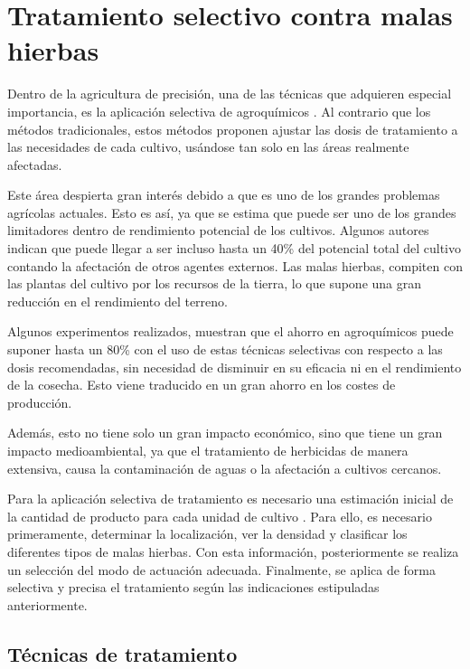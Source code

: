 \section{Tratamiento selectivo contra malas hierbas}

Dentro de la agricultura de precisión, una de las técnicas que adquieren especial importancia, es la aplicación selectiva de agroquímicos \cite{precisionweedmanagement}. Al contrario que los métodos tradicionales, estos métodos proponen ajustar las dosis de tratamiento a las necesidades de cada cultivo, usándose tan solo en las áreas realmente afectadas.

Este área despierta gran interés debido a que es uno de los grandes problemas agrícolas actuales. Esto es así, ya que se estima que puede ser uno de los grandes limitadores dentro de rendimiento potencial de los cultivos. Algunos autores indican que puede llegar a ser incluso hasta un 40\% del potencial total del cultivo \cite{Oerke1999} contando la afectación de otros agentes externos. Las malas hierbas, compiten con las plantas del cultivo por los recursos de la tierra, lo que supone una gran reducción en el rendimiento del terreno.

Algunos experimentos realizados, muestran que el ahorro en agroquímicos puede suponer hasta un 80\% con el uso de estas técnicas selectivas \cite{RUIZ2006} \cite{Hamouz2018ImpactOS} con respecto a las dosis recomendadas, sin necesidad de disminuir en su eficacia ni en el rendimiento de la cosecha. Esto viene traducido en un gran ahorro en los costes de producción.

Además, esto no tiene solo un gran impacto económico, sino que tiene un gran impacto medioambiental, ya que el tratamiento de herbicidas de manera extensiva, causa la contaminación de aguas o la afectación a cultivos cercanos.

Para la aplicación selectiva de tratamiento es necesario una estimación inicial de la cantidad de producto para cada unidad de cultivo \cite{Senay1998}. Para ello, es necesario primeramente, determinar la localización, ver la densidad y clasificar los diferentes tipos de malas hierbas. Con esta información, posteriormente se realiza un selección del modo de actuación adecuada. Finalmente, se aplica de forma selectiva y precisa el tratamiento según las indicaciones estipuladas anteriormente.

\subsection{Técnicas de tratamiento}

